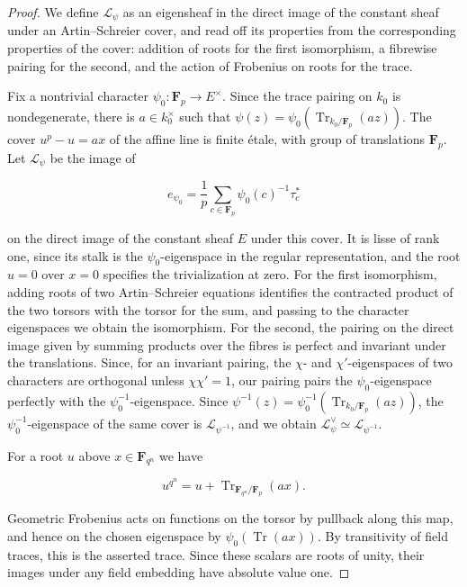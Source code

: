 \documentclass[11pt]{article}
\begin{document}
\begin{proof}[{Proof}]\label{bp6}%
We define \(\mathcal L_\psi\) as an eigensheaf in the direct image of the constant sheaf under an Artin–Schreier cover, and read off its properties from the corresponding properties of the cover: addition of roots for the first isomorphism, a fibrewise pairing for the second, and the action of Frobenius on roots for the trace.

Fix a nontrivial character \(\psi_0:\mathbf F_p\to E^\times\). Since the trace pairing on \(k_0\) is nondegenerate, there is \(a\in k_0^\times\) such that \(\psi(z)=\psi_0(\operatorname{Tr}_{k_0/\mathbf F_p}(az))\). The cover \(u^p-u=ax\) of the affine line is finite étale, with group of translations \(\mathbf F_p\). Let \(\mathcal L_\psi\) be the image of

\[
e_{\psi_0}=\frac1p\sum_{c\in\mathbf F_p}\psi_0(c)^{-1}\tau_c^*
\]

on the direct image of the constant sheaf \(E\) under this cover. It is lisse of rank one, since its stalk is the \(\psi_0\)-eigenspace in the regular representation, and the root \(u=0\) over \(x=0\) specifies the trivialization at zero. For the first isomorphism, adding roots of two Artin–Schreier equations identifies the contracted product of the two torsors with the torsor for the sum, and passing to the character eigenspaces we obtain the isomorphism. For the second, the pairing on the direct image given by summing products over the fibres is perfect and invariant under the translations. Since, for an invariant pairing, the \(\chi\)- and \(\chi'\)-eigenspaces of two characters are orthogonal unless \(\chi\chi'=1\), our pairing pairs the \(\psi_0\)-eigenspace perfectly with the \(\psi_0^{-1}\)-eigenspace. Since \(\psi^{-1}(z)=\psi_0^{-1}(\operatorname{Tr}_{k_0/\mathbf F_p}(az))\), the \(\psi_0^{-1}\)-eigenspace of the same cover is \(\mathcal L_{\psi^{-1}}\), and we obtain \(\mathcal L_\psi^\vee\simeq\mathcal L_{\psi^{-1}}\).

For a root \(u\) above \(x\in\mathbf F_{q^n}\) we have

\[
u^{q^n}=u+
\operatorname{Tr}_{\mathbf F_{q^n}/\mathbf F_p}(ax).
\]

Geometric Frobenius acts on functions on the torsor by pullback along this map, and hence on the chosen eigenspace by \(\psi_0(\operatorname{Tr}(ax))\). By transitivity of field traces, this is the asserted trace. Since these scalars are roots of unity, their images under any field embedding have absolute value one.
\end{proof}
\end{document}
